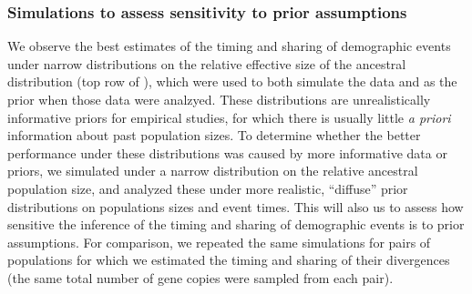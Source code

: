 \ifembed{

}{}

\ifembed{

}{}


\subsubsection{Simulations to assess sensitivity to prior assumptions}

We observe the best estimates of the timing and sharing of demographic
events under narrow distributions on the relative effective size of the
ancestral distribution
(top row of \figs
{}),
which were used to both simulate the data and as the prior
when those data were analzyed.
These distributions are unrealistically informative priors for empirical
studies, for which there is usually little \emph{a priori} information about
past population sizes.
To determine whether the better performance under these distributions was
caused by more informative data or priors, we simulated \datasets under a
narrow distribution on the relative ancestral population size, and analyzed
these \datasets under more realistic, ``diffuse'' prior distributions on
populations sizes and event times.
This will also us to assess how sensitive the inference of the timing
and sharing of demographic events is to prior assumptions.
For comparison, we repeated the same simulations for pairs of populations for
which we estimated the timing and sharing of their divergences (the same total
number of gene copies were sampled from each pair).


